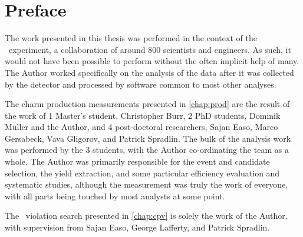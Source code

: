 \chapter{Preface}


The work presented in this thesis was performed in the context of the \lhcb\ 
experiment, a collaboration of around 800 scientists and engineers.
As such, it would not have been possible to perform without the often implicit 
help of many.
The Author worked specifically on the analysis of the data after it was 
collected by the detector and processed by software common to most other 
analyses.

The charm production measurements presented in \cref{chap:prod} are the result 
of the work of 1 Master's student, Christopher Burr, 2 PhD students, Dominik 
M\"{u}ller and the Author, and 4 post-doctoral researchers, Sajan Easo, Marco 
Gersabeck, Vava Gligorov, and Patrick Spradlin.
The bulk of the analysis work was performed by the 3 students, with the Author 
co-ordinating the team as a whole.
The Author was primarily responsible for the event and candidate selection, the 
yield extraction, and some particular efficiency evaluation and systematic 
studies, although the measurement was truly the work of everyone, with all 
parts being touched by most analysts at some point.

The \CP\ violation search presented in \cref{chap:cpv} is solely the work of 
the Author, with supervision from Sajan Easo, George Lafferty, and Patrick 
Spradlin.
